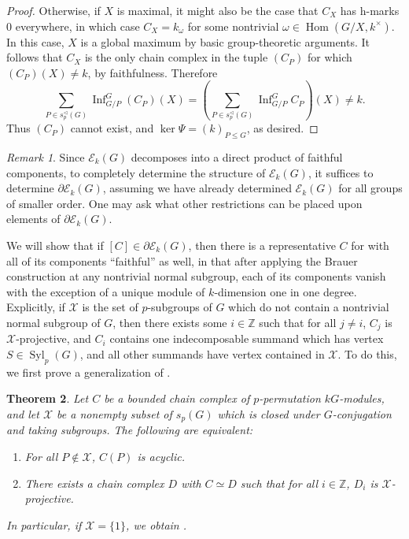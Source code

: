 \documentclass[10pt,letterpaper, boxed, cm]{amsart}
\newcommand{\Z}{\mathbb{Z}}
\newcommand{\Hom}{\operatorname{Hom}}
\newcommand{\Inf}{\operatorname{Inf}}
\newcommand{\Syl}{\operatorname{Syl}}
\newcommand{\calE}{\mathcal{E}}
\newcommand{\calX}{\mathcal{X}}
\newtheorem{theorem}{Theorem}[section]
\theoremstyle{remark}
\newtheorem{remark}[theorem]{Remark}
\theoremstyle{definition}
\begin{document}
\begin{proof}
		Otherwise, if $X$ is maximal, it might also be the case that $C_X$ has h-marks 0 everywhere, in which case $C_X = k_\omega$ for some nontrivial $\omega \in \Hom(G/X, k^\times)$. In this case, $X$ is a global maximum by basic group-theoretic arguments. It follows that $C_X$ is the only chain complex in the tuple $(C_P)$ for which $(C_P)(X) \neq k$, by faithfulness. Therefore \[\sum_{P \in s_p^\triangleleft(G)} \Inf^{G}_{G/P} (C_P) (X) = \left(\sum_{P \in s_p^\triangleleft(G)} \Inf^{G}_{G/P} C_P\right)(X) \neq k.\]
		Thus $(C_P)$ cannot exist, and $\ker \Psi = (k)_{P\leq G}$, as desired.
	\end{proof}

	\begin{remark}
		Since $\calE_k(G)$ decomposes into a direct product of faithful components, to completely determine the structure of $\calE_k(G)$, it suffices to determine $\partial\calE_k(G)$, assuming we have already determined $\calE_k(G)$ for all groups of smaller order. One may ask what other restrictions can be placed upon elements of $\partial\calE_k(G)$.

		We will show that if $[C] \in\partial\calE_k(G)$, then there is a representative $C$ for with all of its components ``faithful'' as well, in that after applying the Brauer construction at any nontrivial normal subgroup, each of its components vanish with the exception of a unique module of $k$-dimension one in one degree. Explicitly, if $\calX$ is the set of $p$-subgroups of $G$ which do not contain a nontrivial normal subgroup of $G$, then there exists some $i \in \Z$ such that for all $j \neq i$, $C_j$ is $\calX$-projective, and $C_i$ contains one indecomposable summand which has vertex $S \in \Syl_p(G)$, and all other summands have vertex contained in $\calX$. To do this, we first prove a generalization of \cite[Theorem 7.9]{Bou98}.
	\end{remark}

	\begin{theorem}\label{boucthmgeneralization}
		Let $C$ be a bounded chain complex of $p$-permutation $kG$-modules, and let $\mathcal{X}$ be a nonempty subset of $s_p(G)$ which is closed under $G$-conjugation and taking subgroups. The following are equivalent:
		\begin{enumerate}
			\item For all $P \not\in\mathcal{X}$, $C(P)$ is acyclic.
			\item There exists a chain complex $D$ with $C\simeq D$ such that for all $i \in \Z$, $D_i$ is $\calX$-projective.
		\end{enumerate}
		In particular, if $\mathcal{X} = \{1\}$, we obtain \cite[Theorem 7.9]{Bou98}.
	\end{theorem}
\end{document}
